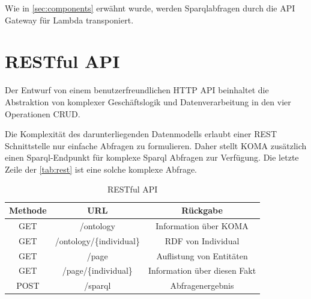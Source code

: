 \documentclass[
12pt,
english,
ngerman,
headsepline,
twoside,
openright,
numbers=noenddot,version=first
]{scrreprt}
\providecommand{\tabularnewline}{\\}
\begin{document}
Wie in \autoref{sec:components} erwähnt wurde, werden Sparqlabfragen durch die \acrshort{API} Gateway für Lambda transponiert.




\section{RESTful API}
\label{sec:rest}
Der Entwurf von einem benutzerfreundlichen \acrfull{HTTP} \acrshort{API} beinhaltet die Abstraktion von komplexer Geschäftslogik und Datenverarbeitung  in den vier Operationen \acrfull{CRUD}.

Die Komplexität des darunterliegenden Datenmodells erlaubt einer \acrshort{REST} Schnittstelle nur einfache Abfragen zu formulieren.\cite{microAdv} Daher stellt \acrshort{KOMA} zusätzlich einen Sparql-Endpunkt für komplexe Sparql Abfragen zur Verfügung. Die letzte Zeile der \autoref{tab:rest} ist eine solche komplexe Abfrage.

\begin{table}[H]
	\caption{RESTful API}\label{tab:rest}
	\noindent 
	\centering{}
	\begin{tabular}{ccc}
		\hline
		\noalign{\vskip\doublerulesep}
		Methode & URL & Rückgabe\tabularnewline[\doublerulesep]
		\hline
		\noalign{\vskip\doublerulesep}
		GET & /ontology & Information über KOMA
		\tabularnewline[\doublerulesep]\noalign{\vskip\doublerulesep}
		\noalign{\vskip\doublerulesep}
		GET & /ontology/\{individual\} & RDF von Individual
		\tabularnewline[\doublerulesep]\noalign{\vskip\doublerulesep}
		GET & /page & Auflistung von Entitäten 
		\tabularnewline[\doublerulesep]\noalign{\vskip\doublerulesep}
		GET & /page/\{individual\} & Information über diesen Fakt
		\tabularnewline[\doublerulesep]\noalign{\vskip\doublerulesep}
		POST & /sparql & Abfragenergebnis
		
	\end{tabular}
\end{table}
\end{document}
